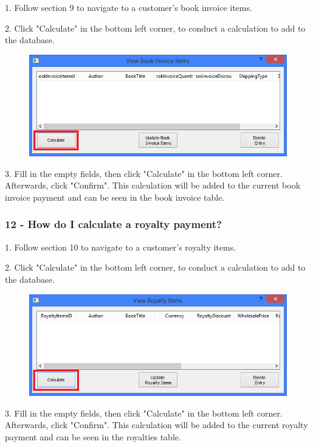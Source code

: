 1. Follow section 9 to navigate to a customer's book invoice items.

2. Click "Calculate" in the bottom left corner, to conduct a calculation to add to the database.

\begin{figure}[H]
    \includegraphics[width=\textwidth]{./Manual/Tutorial/Q11/CalculatePayment.png}
\end{figure}

3. Fill in the empty fields, then click "Calculate" in the bottom left corner. Afterwards, click "Confirm". This calculation will be added to the current book invoice payment and can be seen in the book invoice table.

\subsubsection{12 - How do I calculate a royalty payment?} \label{sssec:Q12}

1. Follow section 10 to navigate to a customer's royalty items.

2. Click "Calculate" in the bottom left corner, to conduct a calculation to add to the database.

\begin{figure}[H]
    \includegraphics[width=\textwidth]{./Manual/Tutorial/Q12/CalculatePayment.png}
\end{figure}

3. Fill in the empty fields, then click "Calculate" in the bottom left corner. Afterwards, click "Confirm". This calculation will be added to the current royalty payment and can be seen in the royalties table.

